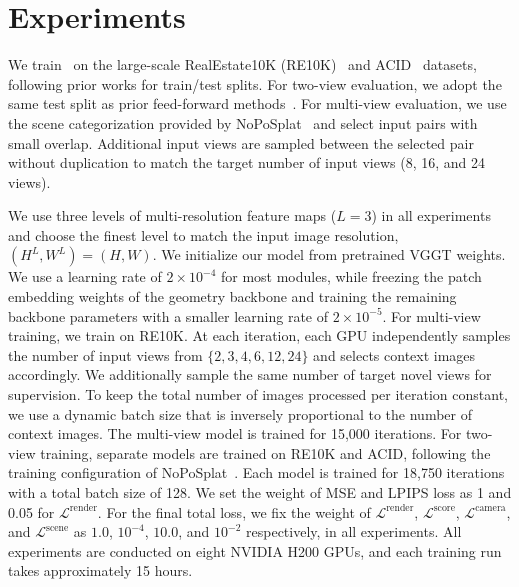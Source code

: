\section{Experiments}

We train \OURMODEL\ on the large-scale RealEstate10K (RE10K)~\cite{zhou2018re10k} and ACID~\cite{liu2021acid} datasets, following prior works for train/test splits.
For two-view evaluation, we adopt the same test split as prior feed-forward methods~\cite{charatan2024pixelsplat, chen2024mvsplat, xu2025depthsplat, li2025vicasplat, ye2024nopo}. 
For multi-view evaluation, we use the scene categorization provided by NoPoSplat~\cite{ye2024nopo} and select input pairs with small overlap. Additional input views are sampled between the selected pair without duplication to match the target number of input views (8, 16, and 24 views).

 We use three levels of multi-resolution feature maps (\(L=3\)) in all experiments and choose the finest level to match the input image resolution, $(H^L, W^L)\!=\!(H,W)$. We initialize our model from pretrained VGGT weights. We use a learning rate of \(2\times10^{-4}\) for most modules, while freezing the patch embedding weights of the geometry backbone and training the remaining backbone parameters with a smaller learning rate of \(2\times10^{-5}\).
For multi-view training, we train on RE10K. At each iteration, each GPU independently samples the number of input views from $\{2,3,4,6,12,24\}$ and selects context images accordingly. We additionally sample the same number of target novel views for supervision. To keep the total number of images processed per iteration constant, we use a dynamic batch size that is inversely proportional to the number of context images. The multi-view model is trained for 15,000 iterations.
For two-view training, separate models are trained on RE10K and ACID, following the training configuration of NoPoSplat~\cite{ye2024nopo}. Each model is trained for 18,750 iterations with a total batch size of 128. We set the weight of MSE and LPIPS loss as 1 and 0.05 for $\mathcal{L}^\text{render}$. For the final total loss, we fix the weight of $\mathcal{L}^\text{render}$, $\mathcal{L}^\text{score}$, $\mathcal{L}^\text{camera}$, and $\mathcal{L}^\text{scene}$ as $1.0$, $10^{-4}$, $10.0$, and $10^{-2}$ respectively, in all experiments. All experiments are conducted on eight NVIDIA H200 GPUs, and each training run takes approximately 15 hours.

